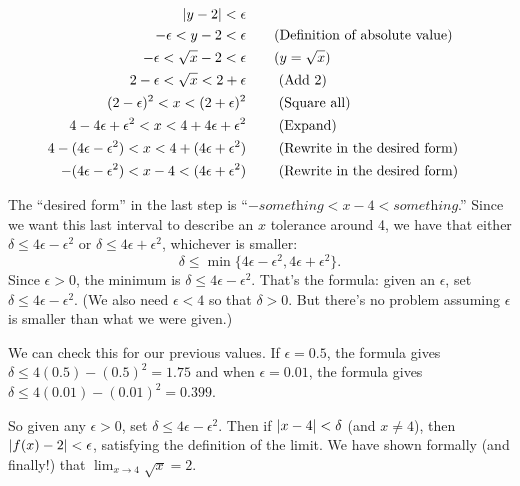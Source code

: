 \begin{example}
\begin{align*}
\left\lvert y - 2 \right\rvert < \epsilon \\
-\epsilon < y - 2 < \epsilon & \qquad \textrm{(Definition of absolute value)}\\
-\epsilon < \sqrt{x} - 2 < \epsilon  &\qquad\text{($y=\sqrt{x}$)}\\
2 - \epsilon < \sqrt{x} < 2+ \epsilon &\qquad \text{ (Add 2)}\\
(2 - \epsilon)^2 < x < (2+ \epsilon) ^2 &\qquad \text{ (Square all)}\\
4 - 4\epsilon + \epsilon^2 < x < 4 + 4\epsilon + \epsilon^2 &\qquad \text{ (Expand)}\\
4 - (4\epsilon - \epsilon^2) < x < 4 + (4\epsilon + \epsilon^2) &\qquad \text{ (Rewrite in the desired form)} \\
- (4\epsilon - \epsilon^2) < x-4 < (4\epsilon + \epsilon^2) &\qquad \text{ (Rewrite in the desired form)}
\end{align*}

The ``desired form'' in the last step is ``$-\textit{something} < x-4 < \textit{something}$.''
Since we want this last interval to describe an $x$ tolerance around 4, we have that either $\delta \leq 4\epsilon - \epsilon^2$ or $\delta \leq 4\epsilon + \epsilon^2$, whichever is smaller:
\[\delta \leq \min\{4\epsilon - \epsilon^2, 4\epsilon + \epsilon^2\}\text{.}\]
Since $\epsilon > 0$, the minimum is $\delta \leq 4\epsilon - \epsilon^2$.  That's the formula: given an $\epsilon$, set $\delta \leq 4\epsilon-\epsilon^2$. (We also need $\epsilon<4$ so that $\delta>0$.  But there's no problem assuming $\epsilon$ is smaller than what we were given.)

We can check this for our previous values.  If $\epsilon=0.5$, the formula gives
$\delta \leq 4(0.5) - (0.5)^2 = 1.75$ and when $\epsilon=0.01$, the formula gives $\delta \leq 4(0.01) - (0.01)^2 = 0.399$.

So given any $\epsilon >0$, set $\delta \leq 4\epsilon - \epsilon^2$. Then if $\left\lvert x-4 \right\rvert<\delta$ (and $x\neq 4$), then $\left\lvert f(x) - 2 \right\rvert < \epsilon$,  satisfying the definition of the limit.  We have shown formally (and finally!) that $\displaystyle \lim_{x\rightarrow 4} \sqrt{x} = 2 $.
\end{example}


